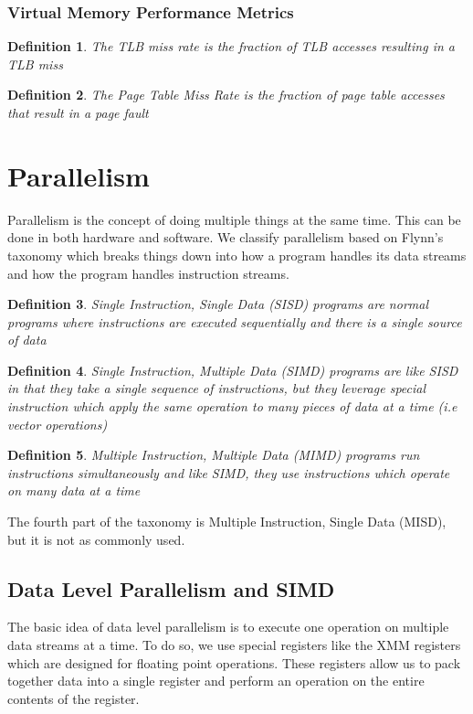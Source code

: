 \documentclass{article}
\newtheorem{definition}{Definition}
\begin{document}
\subsubsection{Virtual Memory Performance Metrics}
\begin{definition}
    The TLB miss rate is the fraction of TLB accesses resulting in a TLB miss
\end{definition}
\begin{definition}
    The Page Table Miss Rate is the fraction of page table accesses that result in a page fault
\end{definition}
\section{Parallelism}
Parallelism is the concept of doing multiple things at the same time. This can be done in both hardware and software.
We classify parallelism based on Flynn's taxonomy which breaks things down into how a program handles its data streams and how the program handles instruction streams.
\begin{definition}
    Single Instruction, Single Data (SISD) programs are normal programs where instructions are executed sequentially and there is a single source of data
\end{definition}
\begin{definition}
    Single Instruction, Multiple Data (SIMD) programs are like SISD in that they take a single sequence of instructions, but they leverage special instruction which apply the same
    operation to many pieces of data at a time (i.e vector operations)
\end{definition}
\begin{definition}
    Multiple Instruction, Multiple Data (MIMD) programs run instructions simultaneously and like SIMD, they use instructions which operate on many data at a time
\end{definition}
The fourth part of the taxonomy is Multiple Instruction, Single Data (MISD), but it is not as commonly used.
\subsection{Data Level Parallelism and SIMD}
The basic idea of data level parallelism is to execute one operation on multiple data streams at a time.
To do so, we use special registers like the XMM registers which are designed for floating point operations.
These registers allow us to pack together data into a single register and perform an operation on the entire contents of the register.
\end{document}
